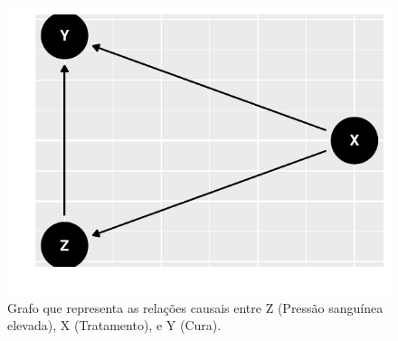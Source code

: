 \begin{example}
\begin{knitrout}
\color{fgcolor}\begin{figure}

{\centering \includegraphics[width=\maxwidth]{./figures/simpson_pressao-1} 

}

\caption[Grafo que representa as relações causais entre Z (Pressão sanguínea elevada), X (Tratamento), e Y (Cura)]{Grafo que representa as relações causais entre Z (Pressão sanguínea elevada), X (Tratamento), e Y (Cura).}\label{fig:simpson_pressao}
\end{figure}

\end{knitrout}
 

\end{example}
